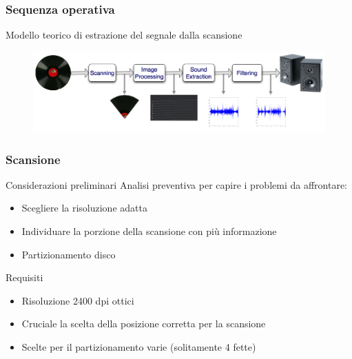 \begin{frame}
\frametitle{Sequenza operativa}
\begin{block}{Modello teorico di estrazione del segnale dalla scansione}
\begin{figure}
\includegraphics[width=\textwidth]{immagini/block-scheme.png}
\end{figure}
\end{block}
\end{frame}

\begin{frame}
\frametitle{Scansione}
\begin{block}{Considerazioni preliminari}
Analisi preventiva per capire i problemi da affrontare:
\begin{itemize}
\item Scegliere la risoluzione adatta
\item Individuare la porzione della scansione con più informazione
\item Partizionamento disco
\end{itemize}
\end{block}


\begin{block}{Requisiti}
\begin{itemize}
\item Risoluzione 2400 dpi ottici
\item Cruciale la scelta della posizione corretta per la scansione
\item Scelte per il partizionamento varie (solitamente 4 fette)
\end{itemize}
\end{block}
\end{frame}

